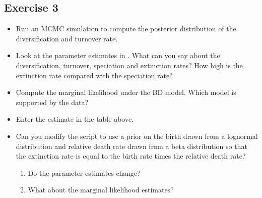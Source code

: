 \subsection{Exercise 3}

\begin{itemize}
\item Run an MCMC simulation to compute the posterior distribution of the diversification and turnover rate.
\item Look at the parameter estimates in \Tracer. What can you say about the diversification, turnover, speciation and extinction rates? How high is the extinction rate compared with the speciation rate?
\item Compute the marginal likelihood under the BD model. Which model is supported by the data?
\item Enter the estimate in the table above.
\item Can you modify the script to use a prior on the birth drawn from a lognormal distribution and relative death rate drawn from a beta distribution so that the extinction rate is equal to the birth rate times the relative death rate?
\begin{enumerate}[label=\alph*)]
\item Do the parameter estimates change?
\item What about the marginal likelihood estimates?
\end{enumerate}
\end{itemize}





